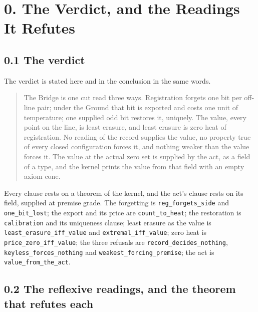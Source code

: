 \documentclass[10pt,twocolumn]{article}
\begin{document}
\hypertarget{the-verdict-and-the-readings-it-refutes}{%
\section{0. The Verdict, and the Readings It
Refutes}\label{the-verdict-and-the-readings-it-refutes}}

\hypertarget{the-verdict}{%
\subsection{0.1 The verdict}\label{the-verdict}}

The verdict is stated here and in the conclusion in the same words.

\begin{quote}
The Bridge is one cut read three ways. Registration forgets one bit per
off-line pair; under the Ground that bit is exported and costs one unit
of temperature; one supplied odd bit restores it, uniquely. The value,
every point on the line, is least erasure, and least erasure is zero
heat of registration. No reading of the record supplies the value, no
property true of every closed configuration forces it, and nothing
weaker than the value forces it. The value at the actual zero set is
supplied by the act, as a field of a type, and the kernel prints the
value from that field with an empty axiom cone.
\end{quote}

Every clause rests on a theorem of the kernel, and the act's clause
rests on its field, supplied at premise grade. The forgetting is
\texttt{reg\_\allowbreak{}forgets\_\allowbreak{}side} and \texttt{one\_\allowbreak{}bit\_\allowbreak{}lost}; the export and
its price are \texttt{count\_\allowbreak{}to\_\allowbreak{}heat}; the restoration is
\texttt{calibration} and its uniqueness clause; least erasure as the
value is \texttt{least\_\allowbreak{}erasure\_\allowbreak{}iff\_\allowbreak{}value} and
\texttt{extremal\_\allowbreak{}iff\_\allowbreak{}value}; zero heat is
\texttt{price\_\allowbreak{}zero\_\allowbreak{}iff\_\allowbreak{}value}; the three refusals are
\texttt{record\_\allowbreak{}decides\_\allowbreak{}nothing}, \texttt{keyless\_\allowbreak{}forces\_\allowbreak{}nothing} and
\texttt{weakest\_\allowbreak{}forcing\_\allowbreak{}premise}; the act is
\texttt{value\_\allowbreak{}from\_\allowbreak{}the\_\allowbreak{}act}.

\hypertarget{the-reflexive-readings-and-the-theorem-that-refutes-each}{%
\subsection{0.2 The reflexive readings, and the theorem that refutes
each}\label{the-reflexive-readings-and-the-theorem-that-refutes-each}}
\end{document}
